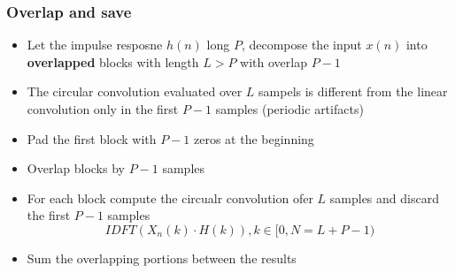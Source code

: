 \subsubsection{Overlap and save}
\begin{itemize}
    \item Let the impulse resposne $h(n)$ long $P$, decompose the input $x(n)$ into \textbf{overlapped} blocks with length $L>P$ with overlap $P-1$
    \item The circular convolution evaluated over $L$ sampels is different from the linear convolution only in the first $P-1$ samples (periodic artifacts)
    \item Pad the first block with $P-1$ zeros at the beginning
    \item Overlap blocks by $P-1$ samples
    \item For each block compute the circualr convolution ofer $L$ samples and discard the first $P-1$ samples
    $$IDFT(X_n(k)\cdot H(k)),k\in [0,N=L+P-1)$$
    \item Sum the overlapping portions between the results
\end{itemize}
